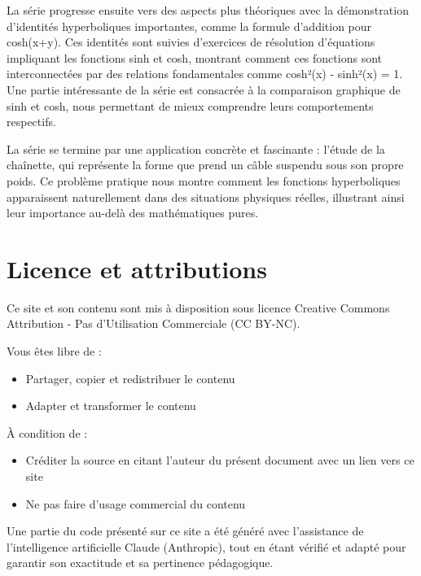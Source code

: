\documentclass[
  12pt,
  letterpaper,
]{book}
\providecommand{\tightlist}{%
  \setlength{\itemsep}{0pt}\setlength{\parskip}{0pt}}\usepackage{longtable,booktabs,array}
\theoremstyle{remark}
\begin{document}
La série progresse ensuite vers des aspects plus théoriques avec la
démonstration d'identités hyperboliques importantes, comme la formule
d'addition pour cosh(x+y). Ces identités sont suivies d'exercices de
résolution d'équations impliquant les fonctions sinh et cosh, montrant
comment ces fonctions sont interconnectées par des relations
fondamentales comme cosh²(x) - sinh²(x) = 1. Une partie intéressante de
la série est consacrée à la comparaison graphique de sinh et cosh, nous
permettant de mieux comprendre leurs comportements respectifs.

La série se termine par une application concrète et fascinante : l'étude
de la chaînette, qui représente la forme que prend un câble suspendu
sous son propre poids. Ce problème pratique nous montre comment les
fonctions hyperboliques apparaissent naturellement dans des situations
physiques réelles, illustrant ainsi leur importance au-delà des
mathématiques pures.

\section*{Licence et attributions}\label{licence-et-attributions}


Ce site et son contenu sont mis à disposition sous licence Creative
Commons Attribution - Pas d'Utilisation Commerciale (CC BY-NC).

\begin{tcolorbox}[enhanced jigsaw, colbacktitle=quarto-callout-note-color!10!white, leftrule=.75mm, title=\textcolor{quarto-callout-note-color}{\faInfo}\hspace{0.5em}{Droits d'utilisation}, opacityback=0, toptitle=1mm, toprule=.15mm, opacitybacktitle=0.6, colframe=quarto-callout-note-color-frame, breakable, bottomrule=.15mm, rightrule=.15mm, titlerule=0mm, left=2mm, bottomtitle=1mm, arc=.35mm, colback=white, coltitle=black]

Vous êtes libre de :

\begin{itemize}
\tightlist
\item
  Partager, copier et redistribuer le contenu
\item
  Adapter et transformer le contenu
\end{itemize}

À condition de :

\begin{itemize}
\tightlist
\item
  Créditer la source en citant l'auteur du présent document avec un lien
  vers ce site
\item
  Ne pas faire d'usage commercial du contenu
\end{itemize}

Une partie du code présenté sur ce site a été généré avec l'assistance
de l'intelligence artificielle Claude (Anthropic), tout en étant vérifié
et adapté pour garantir son exactitude et sa pertinence pédagogique.

\end{tcolorbox}
\end{document}
